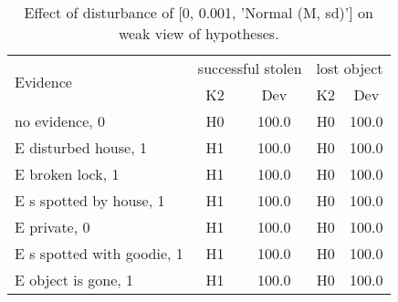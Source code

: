 \begin{table}\begin{tabular}{l|cc|cc}\toprule\multirow{2}{*}{Evidence} & \multicolumn{2}{c}{successful stolen}& \multicolumn{2}{c}{lost object}\\& {K2} & {Dev}& {K2} & {Dev}\\\midrule
no evidence, 0 & H0&100.0&H0&100.0\\E disturbed house, 1 & H1&100.0&H0&100.0\\E broken lock, 1 & H1&100.0&H0&100.0\\E s spotted by house, 1 & H1&100.0&H0&100.0\\E private, 0 & H1&100.0&H0&100.0\\E s spotted with goodie, 1 & H1&100.0&H0&100.0\\E object is gone, 1 & H1&100.0&H0&100.0\\\bottomrule\end{tabular}\caption{Effect of disturbance of [0, 0.001, 'Normal (M, sd)'] on weak view of hypotheses.}\end{table}